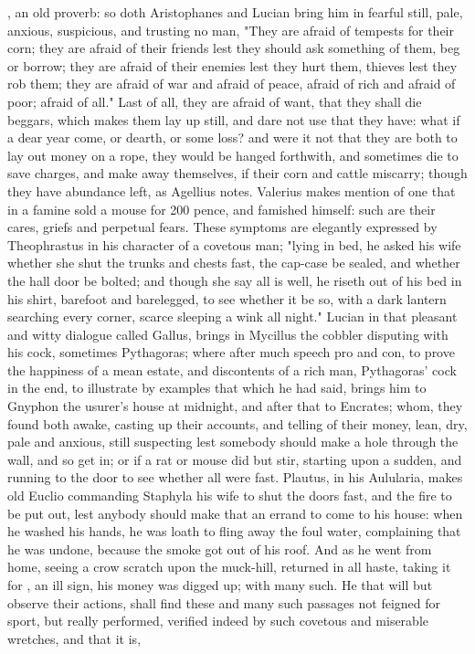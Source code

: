 , an old proverb: so doth
Aristophanes and Lucian bring him in fearful still, pale, anxious, suspicious,
and trusting no man, "They are afraid of tempests for
their corn; they are afraid of their friends lest they should ask something of
them, beg or borrow; they are afraid of their enemies lest they hurt them,
thieves lest they rob them; they are afraid of war and afraid of peace, afraid
of rich and afraid of poor; afraid of all." Last of all, they are afraid of
want, that they shall die beggars, which makes them lay up still, and dare not
use that they have: what if a dear year come, or dearth, or some loss? and were
it not that they are both to lay out money on a rope, they
would be hanged forthwith, and sometimes die to save charges, and make away
themselves, if their corn and cattle miscarry; though they have abundance left,
as Agellius notes. Valerius makes
mention of one that in a famine sold a mouse for 200 pence, and famished
himself: such are their cares, griefs and perpetual fears.
These symptoms are elegantly expressed by Theophrastus in his character of a
covetous man; "lying in bed, he asked his wife whether she
shut the trunks and chests fast, the cap-case be sealed, and whether the hall
door be bolted; and though she say all is well, he riseth out of his bed in his
shirt, barefoot and barelegged, to see whether it be so, with a dark lantern
searching every corner, scarce sleeping a wink all night." Lucian in that
pleasant and witty dialogue called Gallus, brings in Mycillus the cobbler
disputing with his cock, sometimes Pythagoras; where after much speech pro and
con, to prove the happiness of a mean estate, and discontents of a rich man,
Pythagoras' cock in the end, to illustrate by examples that which he had said,
brings him to Gnyphon the usurer's house at midnight, and after that to
Encrates; whom, they found both awake, casting up their accounts, and telling
of their money, lean, dry, pale and anxious, still
suspecting lest somebody should make a hole through the wall, and so get in; or
if a rat or mouse did but stir, starting upon a sudden, and running to the door
to see whether all were fast. Plautus, in his Aulularia, makes old Euclio
commanding Staphyla his wife to shut the doors fast, and
the fire to be put out, lest anybody should make that an errand to come to his
house: when he washed his hands, he was loath to fling
away the foul water, complaining that he was undone, because the smoke got out
of his roof. And as he went from home, seeing a crow scratch upon the
muck-hill, returned in all haste, taking it for , an ill sign,
his money was digged up; with many such. He that will but observe their
actions, shall find these and many such passages not feigned for sport, but
really performed, verified indeed by such covetous and miserable wretches, and
that it is,

